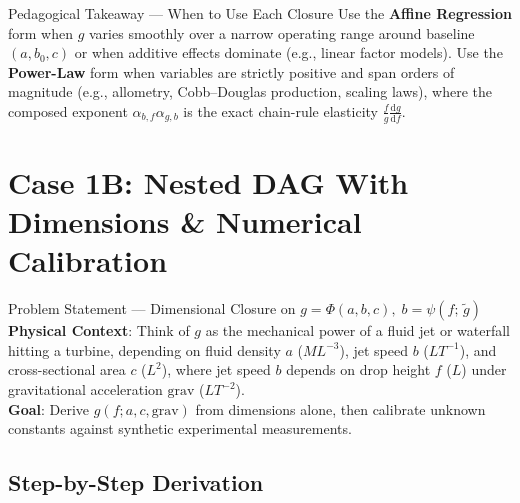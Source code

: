 \documentclass[11pt,a4paper]{article}
\newcommand{\dd}{\mathrm{d}}
\newcommand{\td}[2]{\frac{\dd #1}{\dd #2}}
\begin{document}
\begin{insightbox}{Pedagogical Takeaway — When to Use Each Closure}
Use the \textbf{Affine Regression} form when $g$ varies smoothly over a narrow operating range around baseline $(a, b_0, c)$ or when additive effects dominate (e.g., linear factor models). Use the \textbf{Power-Law} form when variables are strictly positive and span orders of magnitude (e.g., allometry, Cobb--Douglas production, scaling laws), where the composed exponent $\alpha_{b,f}\alpha_{g,b}$ is the exact chain-rule elasticity $\frac{f}{g}\td{g}{f}$.
\end{insightbox}

\section{Case 1B: Nested DAG With Dimensions \& Numerical Calibration}

\begin{setupbox}{Problem Statement — Dimensional Closure on $g = \Phi(a,b,c),\; b = \psi(f;\,\tilde{g})$}
\textbf{Physical Context}: Think of $g$ as the mechanical power of a fluid jet or waterfall hitting a turbine, depending on fluid density $a$ ($ML^{-3}$), jet speed $b$ ($LT^{-1}$), and cross-sectional area $c$ ($L^2$), where jet speed $b$ depends on drop height $f$ ($L$) under gravitational acceleration $\text{grav}$ ($LT^{-2}$).\\
\textbf{Goal}: Derive $g(f; a, c, \text{grav})$ from dimensions alone, then calibrate unknown constants against synthetic experimental measurements.
\end{setupbox}

\begin{center}
\end{center}

\subsection*{Step-by-Step Derivation}
\end{document}
